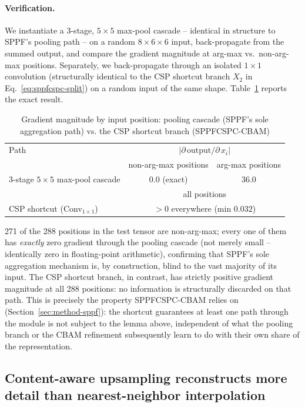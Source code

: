 \documentclass[conference]{IEEEtran}
\begin{document}
\paragraph{Verification.} We instantiate a 3-stage, $5\times5$ max-pool
cascade -- identical in structure to SPPF's pooling path -- on a random
$8\times6\times6$ input, back-propagate from the summed output, and
compare the gradient magnitude at arg-max vs.\ non-arg-max positions.
Separately, we back-propagate through an isolated $1\times1$ convolution
(structurally identical to the CSP shortcut branch $X_2$ in
Eq.~\ref{eq:sppfcspc-split}) on a random input of the same shape.
Table~\ref{tab:bottleneck} reports the exact result.

\begin{table}[htbp]
\caption{Gradient magnitude by input position: pooling cascade (SPPF's
sole aggregation path) vs. the CSP shortcut branch (SPPFCSPC-CBAM)}
\label{tab:bottleneck}
\centering
\begin{tabular}{lcc}
\toprule
Path & \multicolumn{2}{c}{$|\partial\,\mathrm{output}/\partial\,x_i|$} \\
 & non-arg-max positions & arg-max positions \\
\midrule
3-stage $5{\times}5$ max-pool cascade & $0.0$ (exact) & $36.0$ \\
\midrule
 & \multicolumn{2}{c}{all positions} \\
CSP shortcut (Conv$_{1\times1}$) & \multicolumn{2}{c}{$> 0$ everywhere (min $0.032$)} \\
\bottomrule
\end{tabular}
\end{table}

271 of the 288 positions in the test tensor are non-arg-max; every one of
them has \emph{exactly} zero gradient through the pooling cascade (not
merely small -- identically zero in floating-point arithmetic), confirming
that SPPF's sole aggregation mechanism is, by construction, blind to the
vast majority of its input. The CSP shortcut branch, in contrast, has
strictly positive gradient magnitude at all 288 positions: no information
is structurally discarded on that path. This is precisely the property
SPPFCSPC-CBAM relies on (Section~\ref{sec:method-sppf}): the shortcut
guarantees at least one path through the module is not subject to the
lemma above, independent of what the pooling branch or the CBAM
refinement subsequently learn to do with their own share of the
representation.

\subsection{Content-aware upsampling reconstructs more detail than nearest-neighbor interpolation}
\label{sec:theory-carafe}
\end{document}
